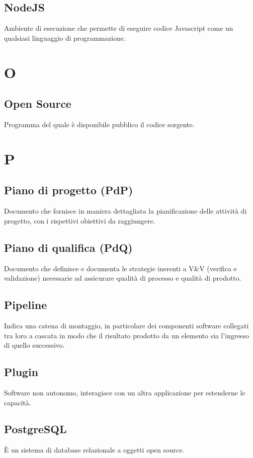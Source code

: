 \documentclass{classes/base}
\begin{document}
        \subsection*{NodeJS}
        Ambiente di esecuzione che permette di eseguire codice Javascript come un qualsiasi linguaggio di programmazione.
        \newpage  
    \section{O}
        \subsection*{Open Source}
        Programma del quale è disponibile pubblico il codice sorgente.
        \newpage  
    \section{P}
        \subsection*{Piano di progetto (PdP)}
        Documento che fornisce in maniera dettagliata la pianificazione delle attività di progetto, con i rispettivi obiettivi da raggiungere. 

        \subsection*{Piano di qualifica (PdQ)} 
        Documento che definisce e documenta le strategie inerenti a V\&V (verifica e validazione) necessarie ad assicurare qualità di processo e qualità di prodotto.

        \subsection*{Pipeline}
        Indica una catena di montaggio, in particolare dei componenti software collegati tra loro a cascata in modo che il risultato prodotto da un elemento sia l'ingresso di quello successivo.

        \subsection*{Plugin}
        Software non autonomo, interagisce con un altra applicazione per estenderne le capacità.

        \subsection*{PostgreSQL}
        È un sistema di database relazionale a oggetti open source.
\end{document}
